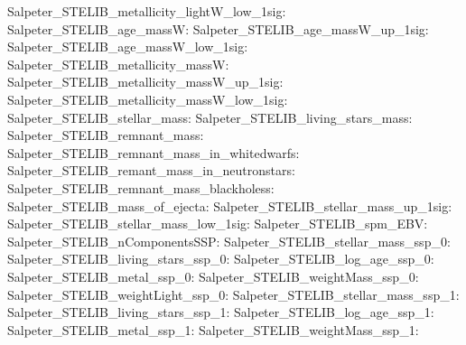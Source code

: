 Salpeter\_STELIB\_metallicity\_lightW\_low\_1sig:  \newline 
Salpeter\_STELIB\_age\_massW:  \newline 
Salpeter\_STELIB\_age\_massW\_up\_1sig:  \newline 
Salpeter\_STELIB\_age\_massW\_low\_1sig:  \newline 
Salpeter\_STELIB\_metallicity\_massW:  \newline 
Salpeter\_STELIB\_metallicity\_massW\_up\_1sig:  \newline 
Salpeter\_STELIB\_metallicity\_massW\_low\_1sig:  \newline 
Salpeter\_STELIB\_stellar\_mass:  \newline 
Salpeter\_STELIB\_living\_stars\_mass:  \newline 
Salpeter\_STELIB\_remnant\_mass:  \newline 
Salpeter\_STELIB\_remnant\_mass\_in\_whitedwarfs:  \newline 
Salpeter\_STELIB\_remant\_mass\_in\_neutronstars:  \newline 
Salpeter\_STELIB\_remnant\_mass\_blackholess:  \newline 
Salpeter\_STELIB\_mass\_of\_ejecta:  \newline 
Salpeter\_STELIB\_stellar\_mass\_up\_1sig:  \newline 
Salpeter\_STELIB\_stellar\_mass\_low\_1sig:  \newline 
Salpeter\_STELIB\_spm\_EBV:  \newline 
Salpeter\_STELIB\_nComponentsSSP:  \newline 
Salpeter\_STELIB\_stellar\_mass\_ssp\_0:  \newline 
Salpeter\_STELIB\_living\_stars\_ssp\_0:  \newline 
Salpeter\_STELIB\_log\_age\_ssp\_0:  \newline 
Salpeter\_STELIB\_metal\_ssp\_0:  \newline 
Salpeter\_STELIB\_weightMass\_ssp\_0:  \newline 
Salpeter\_STELIB\_weightLight\_ssp\_0:  \newline 
Salpeter\_STELIB\_stellar\_mass\_ssp\_1:  \newline 
Salpeter\_STELIB\_living\_stars\_ssp\_1:  \newline 
Salpeter\_STELIB\_log\_age\_ssp\_1:  \newline 
Salpeter\_STELIB\_metal\_ssp\_1:  \newline 
Salpeter\_STELIB\_weightMass\_ssp\_1:  \newline 
